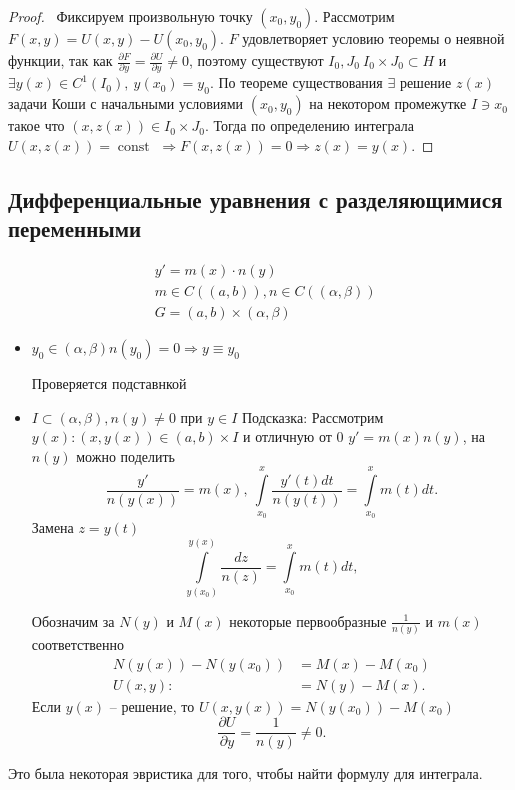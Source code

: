 \documentclass[a4paper]{article}
\theoremstyle{indented}
\theoremstyle{definition}
\theoremstyle{remark}
\DeclareMathOperator{\const}{const}
\begin{document}
\begin{proof} \ 
  Фиксируем произвольную точку $(x_0,y_0)$. Рассмотрим $F(x,y) = U(x,y) - U(x_0,y_0)$.
  $F$ удовлетворяет условию теоремы о неявной функции, так как $\frac{\partial F}{\partial y} = \frac{\partial U}{\partial y} \not  = 0$, поэтому существуют $I_0, J_0 \ I_0 \times J_0 \subset H$ и $\exists y(x) \in  C^1(I_0), \ y(x_0) = y_0$.
  По теореме существования $\exists $ решение $z(x)$ задачи Коши с начальными условиями $(x_0,y_0)$ на некотором промежутке $I \ni x_0$ такое что $(x,z(x)) \in I_0 \times J_0$.
  Тогда по определению интеграла $U(x,z(x)) = \const$ $\Rightarrow F(x,z(x)) = 0 \Rightarrow z(x) = y(x)$.
\end{proof}
\subsection{Дифференциальные уравнения с разделяющимися переменными}
\begin{equation*}
  \begin{aligned}
    & y' = m(x) \cdot n(y) \\
    & m \in C((a,b)), n \in C((\alpha, \beta)) \\
    & G = (a,b) \times (\alpha, \beta)
  \end{aligned}
\end{equation*}

\begin{itemize}
\item $y_0 \in (\alpha, \beta) n(y_0) = 0 \Rightarrow y \equiv y_0$
  
  Проверяется подставнкой
\item $I \subset (\alpha, \beta), n(y) \not  = 0$ при $y \in  I$
  Подсказка:
  Рассмотрим $y(x) : (x,y(x)) \in (a,b) \times I$ и отличную от $0$
  $y' = m(x) n(y)$, на $n(y)$ можно поделить
  \[\frac{y'}{n(y(x))} = m(x), \:
  \int\limits_{x_0}^x\frac{y'(t)dt}{n(y(t))} = \int\limits_{x_0}^x m(t) dt. \]
    Замена $z = y(t)$
  \[\int\limits_{y(x_0)}^{y(x)}\frac{dz}{n(z)} = \int\limits_{x_0}^x m(t) dt,
  \]
 
  Обозначим за $N(y)$ и $M(x)$ некоторые первообразные $\frac{1}{n(y)}$ и $m(x)$ соответственно
  \begin{equation*}
    \begin{aligned}
      N(y(x)) - N(y(x_0)) & = M(x) - M(x_0)\\
      U(x,y) :& = N(y) - M(x).
    \end{aligned}
  \end{equation*}
  Если $y(x)$ -- решение, то $U(x,y(x)) = N(y(x_0)) - M(x_0)$
  \[\frac{\partial U}{\partial y} = \frac{1}{n(y)} \not  = 0. \]
  
\end{itemize}
Это была некоторая эвристика для того, чтобы найти формулу для интеграла.
  
\end{document}
